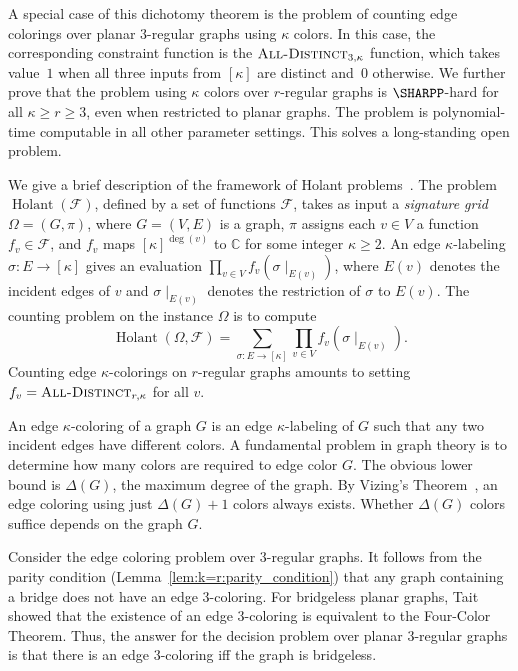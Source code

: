 \documentclass[11pt]{article}
\newcommand{\Holant}{\operatorname{Holant}}
\newcommand{\AllDistinct}{\textsc{All-Distinct}}
\begin{document}
A special case of this dichotomy theorem is the problem of counting edge colorings over planar $3$-regular graphs using $\kappa$ colors.
In this case,
the corresponding constraint function is the $\AllDistinct_{3,\kappa}$ function,
which takes value~$1$ when all three inputs from $[\kappa]$ are distinct and~$0$ otherwise.
We further prove that the problem using $\kappa$ colors over $r$-regular graphs is $\SHARPP$-hard for all $\kappa \ge r \ge 3$,
even when restricted to planar graphs.
The problem is polynomial-time computable in all other parameter settings.
This solves a long-standing open problem.

We give a brief description of the framework of Holant problems~\cite{CLX11c, CLX12, CLX09a, CLX11d}.
The problem $\Holant(\mathcal{F})$,
defined by a set of functions $\mathcal{F}$,
takes as input a \emph{signature grid} $\Omega = (G, \pi)$,
where $G = (V,E)$ is a graph,
$\pi$ assigns each $v \in V$ a function $f_v \in \mathcal{F}$,
and $f_v$ maps $[\kappa]^{\deg(v)}$ to $\mathbb{C}$ for some integer $\kappa \ge 2$.
An edge $\kappa$-labeling $\sigma : E \to [\kappa]$ gives an evaluation $\prod_{v \in V} f_v(\sigma \mid_{E(v)})$,
where $E(v)$ denotes the incident edges of $v$ and $\sigma \mid_{E(v)}$ denotes the restriction of $\sigma$ to $E(v)$.
The counting problem on the instance $\Omega$ is to compute
\[
 \Holant(\Omega, \mathcal{F}) = \sum_{\sigma : E \to [\kappa]} \prod_{v \in V} f_v\left(\sigma \mid_{E(v)}\right).
\]
Counting edge $\kappa$-colorings on $r$-regular graphs amounts to setting $f_v = \AllDistinct_{r,\kappa}$ for all $v$.

An edge $\kappa$-coloring of a graph $G$ is an edge $\kappa$-labeling of $G$ such that any two incident edges have different colors.
A fundamental problem in graph theory is to determine how many colors are required to edge color $G$.
The obvious lower bound is $\Delta(G)$,
the maximum degree of the graph.
By Vizing's Theorem~\cite{Viz65},
an edge coloring using just $\Delta(G) + 1$ colors always exists.
Whether $\Delta(G)$ colors suffice depends on the graph $G$.

Consider the edge coloring problem over $3$-regular graphs.
It follows from the parity condition (Lemma~\ref{lem:k=r:parity_condition})
that any graph containing a bridge does not have an edge $3$-coloring.
For bridgeless planar graphs,
Tait~\cite{Tai80} showed that the existence of an edge $3$-coloring is equivalent to the Four-Color Theorem.
Thus, the answer for the decision problem over planar $3$-regular graphs is that there is an edge $3$-coloring iff the graph is bridgeless.
\end{document}
